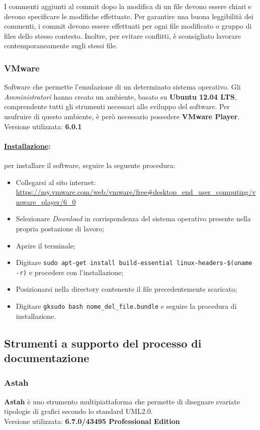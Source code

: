 I commenti aggiunti al commit dopo la modifica di un file devono essere chiari e devono specificare le modifiche effettuate. Per garantire una buona leggibilità dei commenti, i commit devono essere effettuati per ogni file modificato o gruppo di files dello stesso contesto. Inoltre, per evitare conflitti, è sconsigliato lavorare contemporaneamente sugli stessi file.

\subsubsection{VMware}
\label{vmware}
Software che permette l'emulazione di un determinato sistema operativo. Gli \textit{Amministratori} hanno creato un ambiente, basato su \textbf{Ubuntu 12.04 LTS}, comprendente tutti gli strumenti necessari allo sviluppo del software. Per usufruire di questo ambiente, è però necessario possedere \textbf{VMware Player}.\\
Versione utilizzata: \textbf{6.0.1}

\paragraph{\underline{Installazione}:} per installare il software, seguire la seguente procedura:
\begin{itemize}
\item Collegarsi al sito internet: \url{https://my.vmware.com/web/vmware/free#desktop_end_user_computing/vmware_player/6_0}
\item Selezionare \textit{Download} in corrispondenza del sistema operativo presente nella propria postazione di lavoro;
\item Aprire il terminale;
\item Digitare \verb!sudo apt-get install build-essential linux-headers-$(uname -r)! e procedere con l'installazione;
\item Posizionarsi nella directory contenente il file precedentemente scaricato;
\item Digitare \verb!gksudo bash nome_del_file.bundle! e seguire la procedura di installazione.
\end{itemize}

\subsection{Strumenti a supporto del processo di documentazione}

\subsubsection{Astah}
\label{astah}
\textbf{Astah} è uno strumento multipiattaforma che permette di disegnare svariate tipologie di grafici secondo lo standard UML2.0\g{}.\\
Versione utilizzata: \textbf{6.7.0/43495 Professional Edition}

